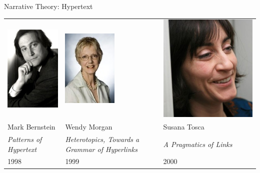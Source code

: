 \documentclass[xcolor=x11names]{beamer}
\newcommand{\work}[1]{\textit{#1}\xspace}
\begin{document}
\begin{frame}{Narrative Theory: Hypertext}
  \begin{tabular}{C{0.3\textwidth} C{0.3\textwidth} C{0.3\textwidth}}
    \includegraphics[height=0.3\textwidth]{res/bernstein.jpg} &
    \includegraphics[height=0.3\textwidth]{res/morgan.jpg} &
    \includegraphics[height=0.3\textwidth]{res/tosca.jpg} \\
    Mark Bernstein & Wendy Morgan & Susana Tosca\\
    \work{Patterns of Hypertext} & \work{Heterotopics, Towards a Grammar of Hyperlinks} & \work{A Pragmatics of Links} \\
    1998 & 1999 & 2000 \\
  \end{tabular}
\end{frame}
\end{document}

